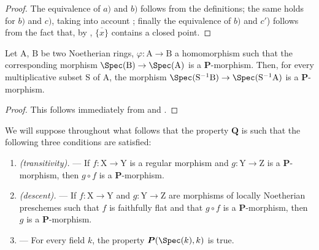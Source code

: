 \begin{proof}
The equivalence of $a)$ and $b)$ follows from the definitions; the same holds for $b)$ and $c)$, taking into account ; finally the equivalence of $b)$ and $c'$) follows from the fact that, by , $\overline{\{x\}}$ contains a closed point.
\end{proof}

\begin{corollary}[7.3.3]
\label{IV.7.3.3}
Let $\mathrm{A}$, $\mathrm{B}$ be two Noetherian rings, $\varphi:\mathrm{A}\to\mathrm{B}$ a homomorphism such that the corresponding morphism $\Spec(\mathrm{B})\to\Spec(\mathrm{A})$ is a $\boldsymbol{P}$-morphism.
Then, for every multiplicative subset $\mathrm{S}$ of $\mathrm{A}$, the morphism $\Spec(\mathrm{S}^{-1}\mathrm{B})\to\Spec(\mathrm{S}^{-1}\mathrm{A})$ is a $\boldsymbol{P}$-morphism.
\end{corollary}

\begin{proof}
This follows immediately from  and .
\end{proof}

\begin{env}[7.3.4]
\label{IV.7.3.4}
We will suppose throughout what follows that the property $\boldsymbol{Q}$ is such that the following three conditions are satisfied:
\begin{enumerate}
  \item[$(\mathrm{P_I})$] \emph{(transitivity).} ---
  If $f:\mathrm{X}\to\mathrm{Y}$ is a regular morphism  and $g:\mathrm{Y}\to\mathrm{Z}$ is a $\boldsymbol{P}$-morphism, then $g\circ f$ is a $\boldsymbol{P}$-morphism.
  \item[$(\mathrm{P_{II}})$] \emph{(descent).} ---
  If $f:\mathrm{X}\to\mathrm{Y}$ and $g:\mathrm{Y}\to\mathrm{Z}$ are morphisms of locally Noetherian preschemes such that $f$ is faithfully flat and that $g\circ f$ is a $\boldsymbol{P}$-morphism, then $g$ is a $\boldsymbol{P}$-morphism.
  \item[$(\mathrm{P_{III}})$] ---
  For every field $k$, the property $\boldsymbol{P}(\Spec(k),k)$ is true.
\end{enumerate}
\end{env}

